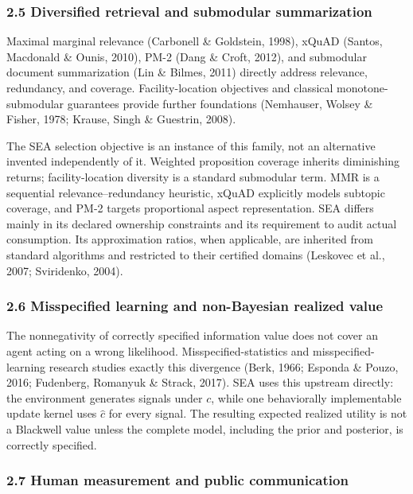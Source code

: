 \documentclass[
  11pt]{article}
\begin{document}
\subsubsection{2.5 Diversified retrieval and submodular
summarization}\label{diversified-retrieval-and-submodular-summarization}

Maximal marginal relevance (Carbonell \& Goldstein, 1998), xQuAD
(Santos, Macdonald \& Ounis, 2010), PM-2 (Dang \& Croft, 2012), and
submodular document summarization (Lin \& Bilmes, 2011) directly address
relevance, redundancy, and coverage. Facility-location objectives and
classical monotone-submodular guarantees provide further foundations
(Nemhauser, Wolsey \& Fisher, 1978; Krause, Singh \& Guestrin, 2008).

The SEA selection objective is an instance of this family, not an
alternative invented independently of it. Weighted proposition coverage
inherits diminishing returns; facility-location diversity is a standard
submodular term. MMR is a sequential relevance--redundancy heuristic,
xQuAD explicitly models subtopic coverage, and PM-2 targets proportional
aspect representation. SEA differs mainly in its declared ownership
constraints and its requirement to audit actual consumption. Its
approximation ratios, when applicable, are inherited from standard
algorithms and restricted to their certified domains (Leskovec et al.,
2007; Sviridenko, 2004).

\subsubsection{2.6 Misspecified learning and non-Bayesian realized
value}\label{misspecified-learning-and-non-bayesian-realized-value}

The nonnegativity of correctly specified information value does not
cover an agent acting on a wrong likelihood. Misspecified-statistics and
misspecified-learning research studies exactly this divergence (Berk,
1966; Esponda \& Pouzo, 2016; Fudenberg, Romanyuk \& Strack, 2017). SEA
uses this upstream directly: the environment generates signals under
\(c\), while one behaviorally implementable update kernel uses
\(\hat c\) for every signal. The resulting expected realized utility is
not a Blackwell value unless the complete model, including the prior and
posterior, is correctly specified.

\subsubsection{2.7 Human measurement and public
communication}\label{human-measurement-and-public-communication}
\end{document}
